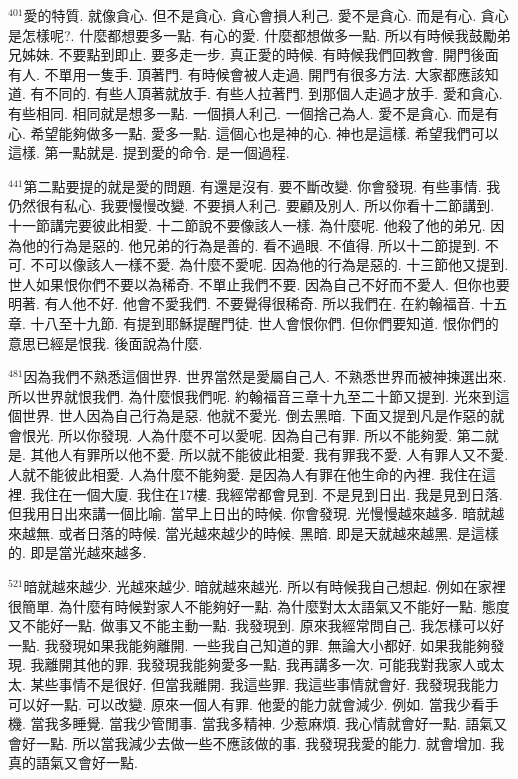 \documentclass{book}
\begin{document}
$^{401}$愛的特質.
就像貪心.
但不是貪心.
貪心會損人利己.
愛不是貪心.
而是有心.
貪心是怎樣呢?.
什麼都想要多一點.
有心的愛.
什麼都想做多一點.
所以有時候我鼓勵弟兄姊妹.
不要點到即止.
要多走一步.
真正愛的時候.
有時候我們回教會.
開門後面有人.
不單用一隻手.
頂著門.
有時候會被人走過.
開門有很多方法.
大家都應該知道.
有不同的.
有些人頂著就放手.
有些人拉著門.
到那個人走過才放手.
愛和貪心.
有些相同.
相同就是想多一點.
一個損人利己.
一個捨己為人.
愛不是貪心.
而是有心.
希望能夠做多一點.
愛多一點.
這個心也是神的心.
神也是這樣.
希望我們可以這樣.
第一點就是.
提到愛的命令.
是一個過程.

$^{441}$第二點要提的就是愛的問題.
有還是沒有.
要不斷改變.
你會發現.
有些事情.
我仍然很有私心.
我要慢慢改變.
不要損人利己.
要顧及別人.
所以你看十二節講到.
十一節講完要彼此相愛.
十二節說不要像該人一樣.
為什麼呢.
他殺了他的弟兄.
因為他的行為是惡的.
他兄弟的行為是善的.
看不過眼.
不值得.
所以十二節提到.
不可.
不可以像該人一樣不愛.
為什麼不愛呢.
因為他的行為是惡的.
十三節他又提到.
世人如果恨你們不要以為稀奇.
不單止我們不要.
因為自己不好而不愛人.
但你也要明著.
有人他不好.
他會不愛我們.
不要覺得很稀奇.
所以我們在.
在約翰福音.
十五章.
十八至十九節.
有提到耶穌提醒門徒.
世人會恨你們.
但你們要知道.
恨你們的意思已經是恨我.
後面說為什麼.

$^{481}$因為我們不熟悉這個世界.
世界當然是愛屬自己人.
不熟悉世界而被神揀選出來.
所以世界就恨我們.
為什麼恨我們呢.
約翰福音三章十九至二十節又提到.
光來到這個世界.
世人因為自己行為是惡.
他就不愛光.
倒去黑暗.
下面又提到凡是作惡的就會恨光.
所以你發現.
人為什麼不可以愛呢.
因為自己有罪.
所以不能夠愛.
第二就是.
其他人有罪所以他不愛.
所以就不能彼此相愛.
我有罪我不愛.
人有罪人又不愛.
人就不能彼此相愛.
人為什麼不能夠愛.
是因為人有罪在他生命的內裡.
我住在這裡.
我住在一個大廈.
我住在17樓.
我經常都會見到.
不是見到日出.
我是見到日落.
但我用日出來講一個比喻.
當早上日出的時候.
你會發現.
光慢慢越來越多.
暗就越來越無.
或者日落的時候.
當光越來越少的時候.
黑暗.
即是天就越來越黑.
是這樣的.
即是當光越來越多.

$^{521}$暗就越來越少.
光越來越少.
暗就越來越光.
所以有時候我自己想起.
例如在家裡很簡單.
為什麼有時候對家人不能夠好一點.
為什麼對太太語氣又不能好一點.
態度又不能好一點.
做事又不能主動一點.
我發現到.
原來我經常問自己.
我怎樣可以好一點.
我發現如果我能夠離開.
一些我自己知道的罪.
無論大小都好.
如果我能夠發現.
我離開其他的罪.
我發現我能夠愛多一點.
我再講多一次.
可能我對我家人或太太.
某些事情不是很好.
但當我離開.
我這些罪.
我這些事情就會好.
我發現我能力可以好一點.
可以改變.
原來一個人有罪.
他愛的能力就會減少.
例如.
當我少看手機.
當我多睡覺.
當我少管閒事.
當我多精神.
少惹麻煩.
我心情就會好一點.
語氣又會好一點.
所以當我減少去做一些不應該做的事.
我發現我愛的能力.
就會增加.
我真的語氣又會好一點.
\end{document}
